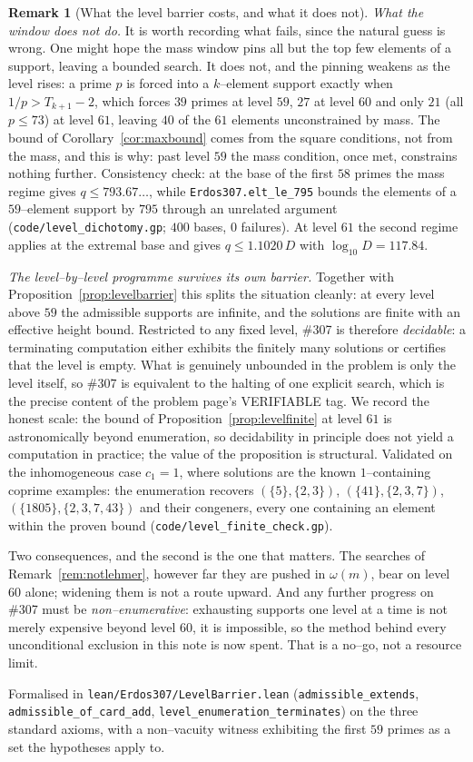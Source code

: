 \documentclass[11pt]{article}
\theoremstyle{definition}
\newtheorem{remark}[theorem]{Remark}
\begin{document}
\begin{remark}[What the level barrier costs, and what it does not]
\emph{What the window does not do.} It is worth recording what fails, since the natural guess is wrong. One might hope the mass window
pins all but the top few elements of a support, leaving a bounded search. It does not, and the
pinning weakens as the level rises: a prime $p$ is forced into a $k$--element support exactly when
$1/p>T_{k+1}-2$, which forces $39$ primes at level $59$, $27$ at level $60$ and only $21$
\textup{(}all $p\le73$\textup{)} at level $61$, leaving $40$ of the $61$ elements unconstrained by
mass. The bound of Corollary~\ref{cor:maxbound} comes from the square conditions, not from the mass,
and this is why: past level $59$ the mass condition, once met, constrains nothing further.
Consistency check: at the base of the first $58$ primes the mass regime gives $q\le793.67\ldots$,
while \texttt{Erdos307.elt\_le\_795} bounds the elements of a $59$--element support by $795$ through
an unrelated argument \textup{(\texttt{code/level\_dichotomy.gp}; $400$ bases, $0$ failures)}.
At level $61$ the second regime applies at the extremal base and gives $q\le1.1020\,D$ with
$\log_{10}D=117.84$.


\emph{The level--by--level programme survives its own barrier.} Together with Proposition~\ref{prop:levelbarrier} this splits the situation cleanly: at every level
above $59$ the admissible supports are infinite, and the solutions are finite with an effective
height bound. Restricted to any fixed level, \#307 is therefore \emph{decidable}: a terminating
computation either exhibits the finitely many solutions or certifies that the level is empty. What
is genuinely unbounded in the problem is only the level itself, so \#307 is equivalent to the
halting of one explicit search, which is the precise content of the problem page's
\textup{VERIFIABLE} tag. We record the honest scale: the bound of
Proposition~\ref{prop:levelfinite} at level $61$ is astronomically beyond enumeration, so
decidability in principle does not yield a computation in practice; the value of the proposition is
structural. Validated on the inhomogeneous case $c_1=1$, where solutions are the known
$1$--containing coprime examples: the enumeration recovers $(\{5\},\{2,3\})$,
$(\{41\},\{2,3,7\})$, $(\{1805\},\{2,3,7,43\})$ and their congeners, every one containing an
element within the proven bound \textup{(\texttt{code/level\_finite\_check.gp})}.


Two consequences, and the second is the one that matters. The searches of
Remark~\ref{rem:notlehmer}, however far they are pushed in $\omega(m)$, bear on level $60$ alone;
widening them is not a route upward. And any further progress on \#307 must be
\emph{non--enumerative}: exhausting supports one level at a time is not merely expensive beyond
level $60$, it is impossible, so the method behind every unconditional exclusion in this note is now
spent. That is a no--go, not a resource limit.

Formalised in \texttt{lean/Erdos307/LevelBarrier.lean} (\texttt{admissible\_extends},
\texttt{admissible\_of\_card\_add}, \texttt{level\_enumeration\_terminates}) on the three standard
axioms, with a non--vacuity witness exhibiting the first $59$ primes as a set the hypotheses apply
to.
\end{remark}
\end{document}

